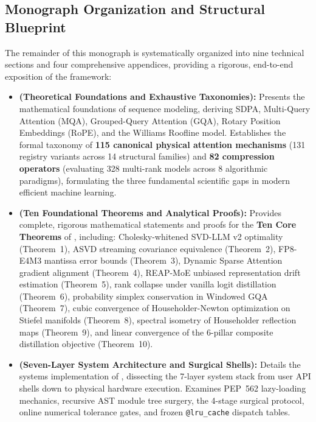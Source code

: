 \subsection{Monograph Organization and Structural Blueprint}
\label{subsec:paper_organization}

The remainder of this monograph is systematically organized into nine technical sections and four comprehensive appendices, providing a rigorous, end-to-end exposition of the \neuralops{} framework:

\begin{itemize}
    \item \textbf{ (Theoretical Foundations and Exhaustive Taxonomies):}
    Presents the mathematical foundations of sequence modeling, deriving SDPA, Multi-Query Attention (MQA), Grouped-Query Attention (GQA), Rotary Position Embeddings (RoPE), and the Williams Roofline model.
    Establishes the formal taxonomy of \textbf{115 canonical physical attention mechanisms} (131 registry variants across 14 structural families) and \textbf{82 compression operators} (evaluating 328 multi-rank models across 8 algorithmic paradigms), formulating the three fundamental scientific gaps in modern efficient machine learning.

    \item \textbf{ (Ten Foundational Theorems and Analytical Proofs):}
    Provides complete, rigorous mathematical statements and proofs for the \textbf{Ten Core Theorems} of \neuralops{}, including:
    Cholesky-whitened SVD-LLM v2 optimality (Theorem~1), ASVD streaming covariance equivalence (Theorem~2), FP8-E4M3 mantissa error bounds (Theorem~3), Dynamic Sparse Attention gradient alignment (Theorem~4), REAP-MoE unbiased representation drift estimation (Theorem~5), rank collapse under vanilla logit distillation (Theorem~6), probability simplex conservation in Windowed GQA (Theorem~7), cubic convergence of Householder-Newton optimization on Stiefel manifolds (Theorem~8), spectral isometry of Householder reflection maps (Theorem~9), and linear convergence of the 6-pillar composite distillation objective (Theorem~10).

    \item \textbf{ (Seven-Layer System Architecture and Surgical Shells):}
    Details the systems implementation of \neuralops{}, dissecting the 7-layer system stack from user API shells down to physical hardware execution.
    Examines PEP~562 lazy-loading mechanics, recursive AST module tree surgery, the 4-stage surgical protocol, online numerical tolerance gates, and frozen \texttt{@lru\_cache} dispatch tables.


\end{itemize}
